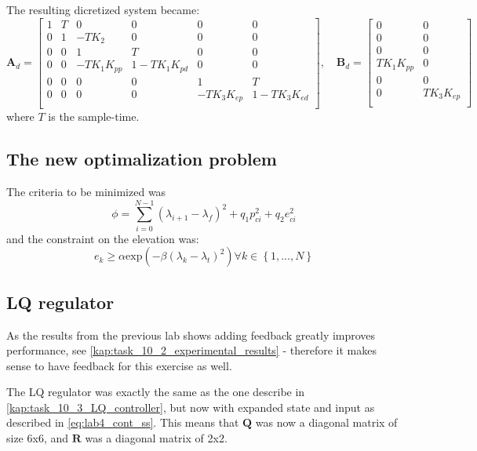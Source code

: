 \documentclass[../main.tex]{subfiles}
\begin{document}
The resulting dicretized system became: 
\begin{equation}\label{eq:lab4_disc_ss}
	\bm A_d = \begin{bmatrix}
		1 & T & 0 & 0 & 0 & 0\\
		0 & 1 & -TK_2 & 0 & 0 & 0\\
		0 & 0 & 1 & T & 0 & 0\\
		0 & 0 & -T K_1 K_{pp} &  1 - T K_1 K_{pd} & 0 & 0\\
		0 & 0 & 0 & 0 & 1 & T \\
		0 & 0 & 0 & 0 & -T K_3 K_{ep} & 1 - TK_3K_{ed} \\
	\end{bmatrix}, \quad
	\bm B_d = \begin{bmatrix}
		0 & 0 \\
		0 & 0\\
		0 & 0\\
		T K_1 K_{pp} & 0\\
		0 & 0 \\
		0 & T K_3K_{ep} \\
	\end{bmatrix}
\end{equation}
where $ T $ is the sample-time.

\subsection{The new optimalization problem}
The criteria to be minimized was
\begin{equation}\label{eq:lab4_cost_func}
	\phi = \sum_{i=0}^{N-1} (\lambda_{i + 1} - \lambda_f)^{2} + q_1 p_{ci}^2 + q_2 e_{ci} ^2
\end{equation}
and the constraint on the elevation was:
\begin{equation}\label{eq:lab4_elevation_constraint}
	e_k \geq \alpha \text{exp}\left( -\beta (\lambda_k - \lambda_t)^2\right) \forall k \in \left\lbrace 1,...,N\right\rbrace 
\end{equation}

\subsection{LQ regulator}
As the results from the previous lab shows adding feedback greatly improves performance, see \cref{kap:task_10_2_experimental_results} - therefore it makes sense to have feedback for this exercise as well.

The LQ regulator was exactly the same as the one describe in \cref{kap:task_10_3_LQ_controller}, but now with expanded state and input as described in \cref{eq:lab4_cont_ss}. This means that $ \bm Q $ was now a diagonal matrix of size 6x6, and $ \bm R $ was a diagonal matrix of 2x2.
\end{document}
